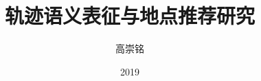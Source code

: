 \documentclass[master]{uestcthesis}
\title{轨迹语义表征与地点推荐研究}
\author{高崇铭}
\date{2019}{2}{14}
\begin{document}
\newcommand{\red}[1]{{\textcolor{red}{{} #1}}}
\newcommand{\ud}{\,\mathrm{d}}
\newcommand{\bt}{\vrule width 0.85pt}
\newcommand{\CoSync}{CoSync}
\newcommand{\Sync}{Sync}
\newcommand{\cosync}{CoSync}
\newcommand{\sync}{Sync}
\makeatletter
\def\hlinew#1{%
  \noalign{\ifnum0=`}\fi\hrule \@height #1 \futurelet
   \reserved@a\@xhline}



% 
% 
% 
\end{document}
